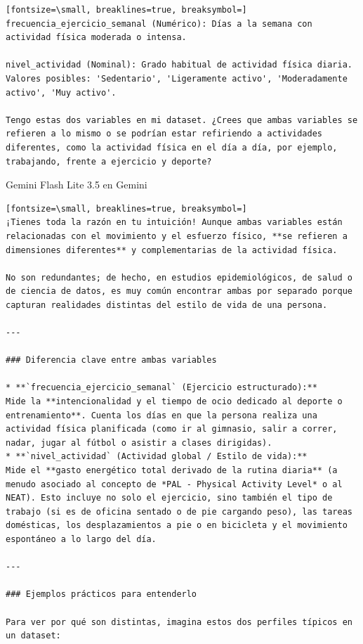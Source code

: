 \documentclass[12pt,a4paper,oneside]{book}
\begin{document}
\begin{iaprompt}
\begin{Verbatim}[fontsize=\small, breaklines=true, breaksymbol=]
frecuencia_ejercicio_semanal (Numérico): Días a la semana con actividad física moderada o intensa.

nivel_actividad (Nominal): Grado habitual de actividad física diaria. Valores posibles: 'Sedentario', 'Ligeramente activo', 'Moderadamente activo', 'Muy activo'.

Tengo estas dos variables en mi dataset. ¿Crees que ambas variables se refieren a lo mismo o se podrían estar refiriendo a actividades diferentes, como la actividad física en el día a día, por ejemplo, trabajando, frente a ejercicio y deporte?
\end{Verbatim}
\end{iaprompt}
\begin{iaresp}{Gemini Flash Lite 3.5 en Gemini}
\begin{Verbatim}[fontsize=\small, breaklines=true, breaksymbol=]
¡Tienes toda la razón en tu intuición! Aunque ambas variables están relacionadas con el movimiento y el esfuerzo físico, **se refieren a dimensiones diferentes** y complementarias de la actividad física.

No son redundantes; de hecho, en estudios epidemiológicos, de salud o de ciencia de datos, es muy común encontrar ambas por separado porque capturan realidades distintas del estilo de vida de una persona.

---

### Diferencia clave entre ambas variables

* **`frecuencia_ejercicio_semanal` (Ejercicio estructurado):**
Mide la **intencionalidad y el tiempo de ocio dedicado al deporte o entrenamiento**. Cuenta los días en que la persona realiza una actividad física planificada (como ir al gimnasio, salir a correr, nadar, jugar al fútbol o asistir a clases dirigidas).
* **`nivel_actividad` (Actividad global / Estilo de vida):**
Mide el **gasto energético total derivado de la rutina diaria** (a menudo asociado al concepto de *PAL - Physical Activity Level* o al NEAT). Esto incluye no solo el ejercicio, sino también el tipo de trabajo (si es de oficina sentado o de pie cargando peso), las tareas domésticas, los desplazamientos a pie o en bicicleta y el movimiento espontáneo a lo largo del día.

---

### Ejemplos prácticos para entenderlo

Para ver por qué son distintas, imagina estos dos perfiles típicos en un dataset:


\end{Verbatim}
\end{iaresp}
\end{document}
